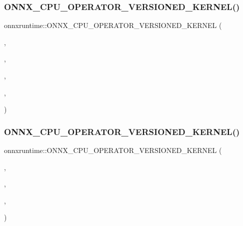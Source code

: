 \subsubsection{\texorpdfstring{O\+N\+N\+X\+\_\+\+C\+P\+U\+\_\+\+O\+P\+E\+R\+A\+T\+O\+R\+\_\+\+V\+E\+R\+S\+I\+O\+N\+E\+D\+\_\+\+K\+E\+R\+N\+E\+L()}{ONNX\_CPU\_OPERATOR\_VERSIONED\_KERNEL()}\hspace{0.1cm}{\footnotesize\ttfamily [10/12]}}
{\footnotesize\ttfamily onnxruntime\+::\+O\+N\+N\+X\+\_\+\+C\+P\+U\+\_\+\+O\+P\+E\+R\+A\+T\+O\+R\+\_\+\+V\+E\+R\+S\+I\+O\+N\+E\+D\+\_\+\+K\+E\+R\+N\+EL (\begin{DoxyParamCaption}\item[{Mean}]{,  }\item[{6}]{,  }\item[{7}]{,  }\item[{\mbox{\hyperlink{classonnxruntime_1_1KernelDefBuilder}{Kernel\+Def\+Builder}}().Type\+Constraint(\char`\"{}T\char`\"{}, Data\+Type\+Impl\+::\+Get\+Tensor\+Type$<$ float $>$())}]{,  }\item[{\mbox{\hyperlink{classonnxruntime_1_1Mean__6}{Mean\+\_\+6}}$<$ float $>$}]{ }\end{DoxyParamCaption})}

\mbox{\label{namespaceonnxruntime_af0c2c700c33ad2ca3b9754488e05b529}} 
\subsubsection{\texorpdfstring{O\+N\+N\+X\+\_\+\+C\+P\+U\+\_\+\+O\+P\+E\+R\+A\+T\+O\+R\+\_\+\+V\+E\+R\+S\+I\+O\+N\+E\+D\+\_\+\+K\+E\+R\+N\+E\+L()}{ONNX\_CPU\_OPERATOR\_VERSIONED\_KERNEL()}\hspace{0.1cm}{\footnotesize\ttfamily [11/12]}}
{\footnotesize\ttfamily onnxruntime\+::\+O\+N\+N\+X\+\_\+\+C\+P\+U\+\_\+\+O\+P\+E\+R\+A\+T\+O\+R\+\_\+\+V\+E\+R\+S\+I\+O\+N\+E\+D\+\_\+\+K\+E\+R\+N\+EL (\begin{DoxyParamCaption}\item[{\mbox{\hyperlink{classonnxruntime_1_1MaxPool}{Max\+Pool}}}]{,  }\item[{1}]{,  }\item[{7}]{,  }\item[{\mbox{\hyperlink{classonnxruntime_1_1KernelDefBuilder}{Kernel\+Def\+Builder}}().Type\+Constraint(\char`\"{}T\char`\"{}, Data\+Type\+Impl\+::\+Get\+Tensor\+Type$<$ float $>$())}]{ }\end{DoxyParamCaption})}


